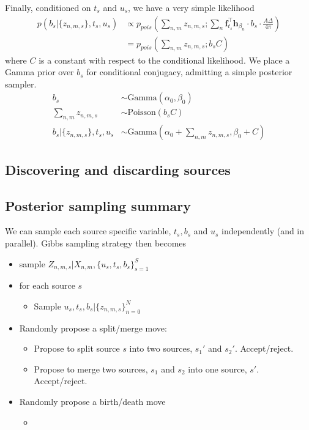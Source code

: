 \documentclass[11pt]{article}
\newcommand{\trans}{\intercal}
\begin{document}
Finally, conditioned on $t_s$ and $u_s$, we have a very simple likelihood
\begin{align}
  p(b_s | \{z_{n,m,s}\}, t_s, u_s) 
    &\propto p_{pois}\left( \sum_{n,m} z_{n,m,s}; \sum_{n} \mathbf{f}_{t_s}^\trans \mathbf{h}_{\beta_n} \cdot b_s \cdot \frac{A \Delta}{4 \pi} \right) \\
    &= p_{pois}\left( \sum_{n,m} z_{n,m,s};  b_s C \right)
\end{align}
where $C$ is a constant with respect to the conditional likelihood.  We place a Gamma prior over $b_s$ for conditional conjugacy, admitting a simple posterior sampler. 
\begin{align}
  b_s &\sim \textrm{Gamma}(\alpha_0, \beta_0) \\
  \sum_{n,m} z_{n,m,s} &\sim \textrm{Poisson}(b_s C) \\
  b_s | \{z_{n,m,s}\}, t_s, u_s &\sim \textrm{Gamma}\left(\alpha_0 + \sum_{n,m}z_{n,m,s}, \beta_0 + C\right)
\end{align}

\subsection{Discovering and discarding sources}

\subsection{Posterior sampling summary}

We can sample each source specific variable, $t_s, b_s$ and $u_s$ independently (and in parallel).  Gibbs sampling strategy then becomes
\begin{itemize}
\item sample $Z_{n,m,s} | X_{n,m}, \{u_s, t_s, b_s\}_{s=1}^S$
\item for each source $s$
  \begin{itemize}
  \item Sample $u_s, t_s, b_s | \{z_{n,m,s}\}_{n=0}^N$
  \end{itemize}
\item Randomly propose a split/merge move: 
  \begin{itemize}
  \item Propose to split source $s$ into two sources, $s_1'$ and $s_2'$.  Accept/reject.
  \item Propose to merge two sources, $s_1$ and $s_2$ into one source, $s'$.  Accept/reject. 
  \end{itemize}
  
\item Randomly propose a birth/death move
  \begin{itemize}
  \item  
  \end{itemize}
\end{itemize}
\end{document}
